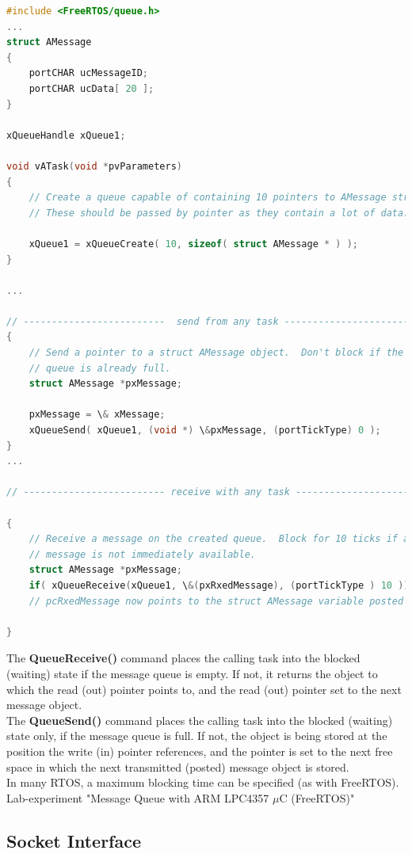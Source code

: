 \begin{lstlisting}[style=mystyle, language=c]
#include <FreeRTOS/queue.h>
...
struct AMessage
{
	portCHAR ucMessageID;
	portCHAR ucData[ 20 ];
}

xQueueHandle xQueue1;

void vATask(void *pvParameters)
{
	// Create a queue capable of containing 10 pointers to AMessage structures.
	// These should be passed by pointer as they contain a lot of data.

	xQueue1 = xQueueCreate( 10, sizeof( struct AMessage * ) );
}

...

// -------------------------  send from any task ----------------------------}
{
 	// Send a pointer to a struct AMessage object.  Don't block if the
  	// queue is already full.
 	struct AMessage *pxMessage;

 	pxMessage = \& xMessage;
	xQueueSend( xQueue1, (void *) \&pxMessage, (portTickType) 0 );
}
...

// ------------------------- receive with any task --------------------------}

{  
	// Receive a message on the created queue.  Block for 10 ticks if a
	// message is not immediately available.
	struct AMessage *pxMessage;
	if( xQueueReceive(xQueue1, \&(pxRxedMessage), (portTickType ) 10 ))
	// pcRxedMessage now points to the struct AMessage variable posted

}
\end{lstlisting}

The \textbf{QueueReceive()} command places the calling task into the blocked (waiting) state if the message queue is empty. If not, it returns the object to which the read (out) pointer points to, and the read (out) pointer set to the next message object.\\

The \textbf{QueueSend()} command places the calling task into the blocked (waiting) state only, if the message queue is full. If not, the object is being stored at the position the write (in) pointer references, and the pointer is set to the next free space in which the next transmitted (posted) message object is stored.\\

In many RTOS, a maximum blocking time can be specified (as with FreeRTOS). Lab-experiment "Message Queue with ARM LPC4357 $\mu$C (FreeRTOS)"

\subsection{Socket Interface}

